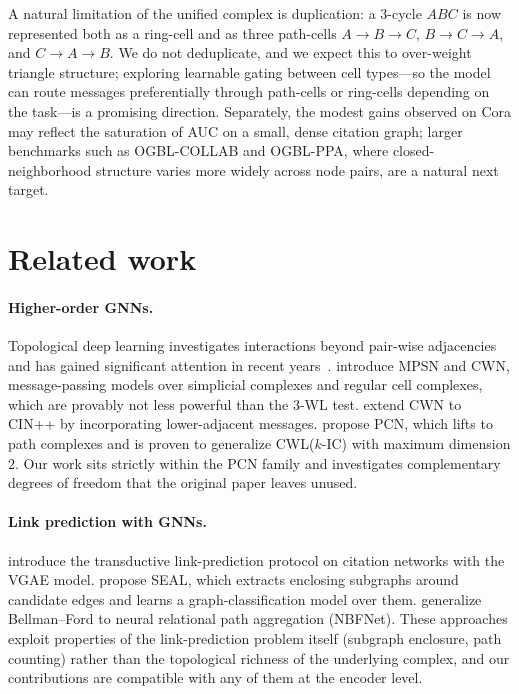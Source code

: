 \documentclass{article}
\begin{document}
A natural limitation of the unified complex is duplication: a $3$-cycle $ABC$ is now represented both as a ring-cell and as three path-cells $A{\to}B{\to}C$, $B{\to}C{\to}A$, and $C{\to}A{\to}B$. We do not deduplicate, and we expect this to over-weight triangle structure; exploring learnable gating between cell types---so the model can route messages preferentially through path-cells or ring-cells depending on the task---is a promising direction. Separately, the modest gains observed on Cora may reflect the saturation of AUC on a small, dense citation graph; larger benchmarks such as OGBL-COLLAB and OGBL-PPA, where closed-neighborhood structure varies more widely across node pairs, are a natural next target.

\section{Related work}
\label{section:related}

\paragraph{Higher-order GNNs.}
Topological deep learning investigates interactions beyond pair-wise adjacencies and has gained significant attention in recent years~\citep{papillon_architectures_2023, hajij_topological_2023}. \citet{bodnar_weisfeiler_2021} introduce MPSN and CWN, message-passing models over simplicial complexes and regular cell complexes, which are provably not less powerful than the $3$-WL test. \citet{giusti_cin_2023} extend CWN to CIN++ by incorporating lower-adjacent messages. \citet{truong_weisfeiler_2024} propose PCN, which lifts to path complexes and is proven to generalize CWL($k$-IC) with maximum dimension $2$. Our work sits strictly within the PCN family and investigates complementary degrees of freedom that the original paper leaves unused.

\paragraph{Link prediction with GNNs.}
\citet{kipf_variational_2016} introduce the transductive link-prediction protocol on citation networks with the VGAE model. \citet{zhang_link_2018} propose SEAL, which extracts enclosing subgraphs around candidate edges and learns a graph-classification model over them. \citet{zhu_neural_2021} generalize Bellman--Ford to neural relational path aggregation (NBFNet). These approaches exploit properties of the link-prediction problem itself (subgraph enclosure, path counting) rather than the topological richness of the underlying complex, and our contributions are compatible with any of them at the encoder level.
\end{document}
